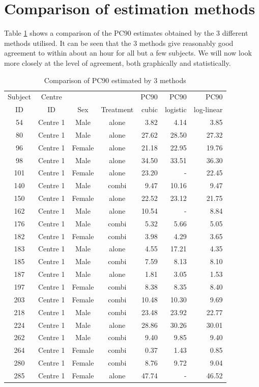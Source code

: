 \section{Comparison of estimation methods}
Table \ref{PC90} shows a comparison of the PC90 estimates obtained by the 3 different methods utilised. It can be seen that the 3 methods give reasonably good agreement to within about an hour for all but a few subjects. We will now look more closely at the level of agreement, both graphically and statistically.
\begin{table}[p]
\centering
\caption{Comparison of PC90 estimated by 3 methods}\label{PC90}
\begin{tabular}{|cccc|rrr|}
\hline
Subject&Centre&&&PC90&PC90&PC90\\
ID&ID&Sex&Treatment&cubic&logistic&log-linear\\
\hline
54&Centre 1&Male&alone&3.82&4.14&3.85\\
80&Centre 1&Male&alone&27.62&28.50&27.32\\
96&Centre 1&Female&alone&21.18&22.95&19.76\\
98&Centre 1&Male&alone&34.50&33.51&36.30\\
101&Centre 1&Female&alone&23.20&-&22.45\\
140&Centre 1&Male&combi&9.47&10.16&9.47\\
150&Centre 1&Female&alone&22.52&23.12&21.75\\
162&Centre 1&Male&alone&10.54&-&8.84\\
176&Centre 1&Male&combi&5.32&5.66&5.05\\
182&Centre 1&Female&combi&3.98&4.29&3.65\\
183&Centre 1&Male&alone&4.55&17.21&4.35\\
185&Centre 1&Male&combi&7.59&8.13&8.10\\
187&Centre 1&Male&alone&1.81&3.05&1.53\\
197&Centre 1&Female&combi&8.38&8.35&8.40\\
203&Centre 1&Female&combi&10.48&10.30&9.69\\
218&Centre 1&Male&combi&23.48&23.92&22.77\\
224&Centre 1&Male&alone&28.86&30.26&30.01\\
262&Centre 1&Male&combi&9.40&9.85&9.40\\
264&Centre 1&Female&combi&0.37&1.43&0.85\\
280&Centre 1&Female&combi&8.76&9.72&9.04\\
285&Centre 1&Female&alone&47.74&-&46.52\\

\end{tabular}
\end{table}
